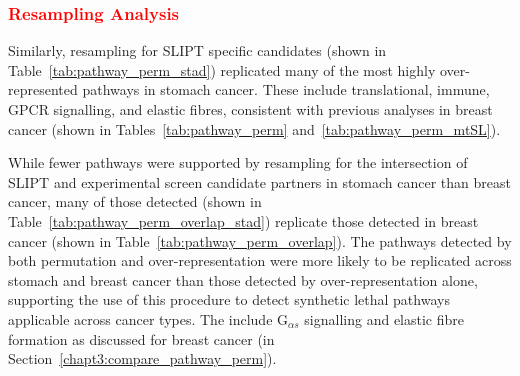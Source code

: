 \subsubsection{\textcolor{red}{Resampling Analysis}}  \label{chapt3:compare_pathway_perm_stad_SL}

Similarly, resampling for \gls{SLIPT} specific candidates (shown in Table~\ref{tab:pathway_perm_stad}) replicated many of the most highly over-represented \glspl{pathway} in stomach cancer. These include translational, immune, \gls{GPCR} signalling, and elastic fibres, consistent with previous analyses in breast cancer (shown in Tables~\ref{tab:pathway_perm} and~\ref{tab:pathway_perm_mtSL}).

While fewer \glspl{pathway} were supported by resampling for the intersection of \gls{SLIPT} and experimental screen \citep{Telford2015} candidate partners in stomach cancer than breast cancer, many of those detected (shown in Table~\ref{tab:pathway_perm_overlap_stad}) replicate those detected in breast cancer (shown in Table~\ref{tab:pathway_perm_overlap}). The \glspl{pathway} detected by both permutation and over-representation were more likely to be replicated across stomach and breast cancer than those detected by over-representation alone, supporting the use of this procedure to detect \gls{synthetic lethal} \glspl{pathway} applicable across cancer types. The include G$_{\alpha s}$ signalling and elastic fibre formation as discussed for breast cancer (in Section~\ref{chapt3:compare_pathway_perm}).

